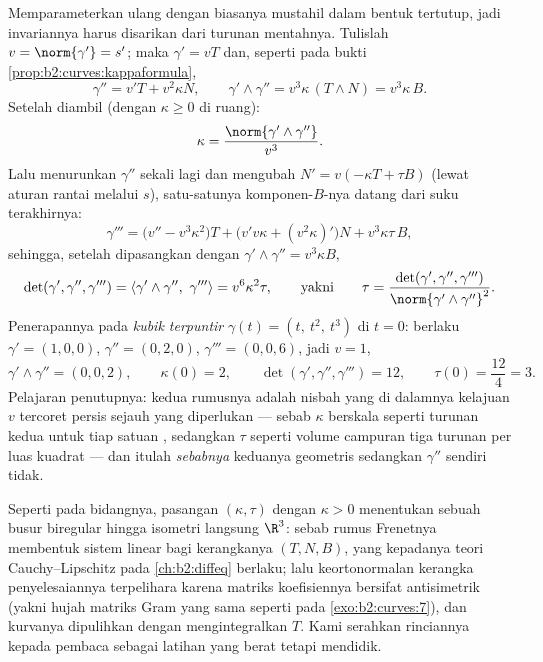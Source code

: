 \begin{example}\label{ex:b2:curves:twistedcubic}
Memparameterkan ulang dengan  biasanya mustahil dalam bentuk
tertutup, jadi invariannya harus disarikan dari turunan
mentahnya. Tulislah $v = \norm{\gamma'} = s'$; maka $\gamma' =
vT$ dan, seperti pada bukti
\cref{prop:b2:curves:kappaformula},
\[
\gamma'' = v'T + v^2\kappa N,
\qquad
\gamma' \wedge \gamma'' = v^3\kappa\,(T \wedge N) =
v^3\kappa\,B .
\]
Setelah  diambil (dengan $\kappa \geq 0$ di ruang):
\[
\kappa = \frac{\norm{\gamma' \wedge \gamma''}}{v^3} .
\]
Lalu menurunkan $\gamma''$ sekali lagi dan mengubah $N' =
v(-\kappa T + \tau B)$ (lewat aturan rantai melalui $s$), satu-satunya
komponen-$B$-nya datang dari suku terakhirnya:
\[
\gamma''' = \bigl(v'' - v^3\kappa^2\bigr)T +
\bigl(v'v\kappa + (v^2\kappa)'\bigr)N + v^3\kappa\tau\,B,
\]
sehingga, setelah dipasangkan dengan $\gamma' \wedge \gamma'' = v^3\kappa B$,
\[
\det(\gamma', \gamma'', \gamma''') = \langle\gamma' \wedge
\gamma'',\ \gamma'''\rangle = v^6\kappa^2\tau,
\qquad\text{yakni}\qquad
\tau = \frac{\det(\gamma', \gamma'',
\gamma''')}{\norm{\gamma' \wedge \gamma''}^2} .
\]
Penerapannya pada \emph{kubik terpuntir} $\gamma(t) = (t,\
t^2,\ t^3)$ di $t = 0$: berlaku $\gamma' = (1, 0, 0)$, $\gamma'' =
(0, 2, 0)$, $\gamma''' = (0, 0, 6)$, jadi $v = 1$,
\[
\gamma' \wedge \gamma'' = (0, 0, 2), \qquad \kappa(0) = 2,
\qquad
\det(\gamma', \gamma'', \gamma''') = 12, \qquad \tau(0) =
\frac{12}{4} = 3 .
\]
Pelajaran penutupnya: kedua rumusnya adalah nisbah yang di dalamnya kelajuan
$v$ tercoret persis sejauh yang diperlukan --- sebab $\kappa$ berskala
seperti turunan kedua untuk tiap satuan , sedangkan $\tau$ seperti
volume campuran tiga turunan per luas kuadrat --- dan itulah
\emph{sebabnya} keduanya geometris sedangkan $\gamma''$ sendiri
tidak.
\end{example}

\begin{remark}
Seperti pada bidangnya, pasangan $(\kappa, \tau)$ dengan $\kappa > 0$
menentukan sebuah busur biregular hingga isometri langsung $\R^3$: sebab
rumus Frenetnya membentuk sistem  linear bagi kerangkanya
$(T, N, B)$, yang kepadanya teori Cauchy--Lipschitz pada
\cref{ch:b2:diffeq} berlaku; lalu keortonormalan kerangka penyelesaiannya
terpelihara karena matriks koefisiennya bersifat antisimetrik (yakni hujah
matriks Gram yang sama seperti pada \cref{exo:b2:curves:7}), dan kurvanya
dipulihkan dengan mengintegralkan $T$. Kami serahkan rinciannya kepada
pembaca sebagai latihan yang berat tetapi mendidik.
\end{remark}


